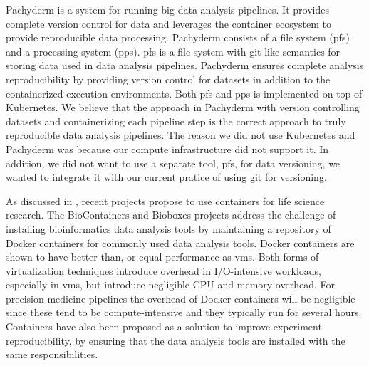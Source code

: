 Pachyderm is a system for running  big data analysis pipelines. It provides
complete version control for data and leverages the container ecosystem to
provide reproducible data processing.\cite{pachyderm} Pachyderm
consists of a file system (\gls{pfs}) and a processing system (\gls{pps}).
\gls{pfs} is a file system with git-like semantics for storing data used
in data analysis pipelines. Pachyderm ensures complete analysis reproducibility
by providing version control for datasets in addition to the containerized
execution environments. Both \gls{pfs} and \gls{pps} is implemented on top
of Kubernetes.\cite{kubernetes} We believe that the approach in
Pachyderm with version controlling datasets and containerizing each pipeline
step is the correct approach to truly reproducible data analysis pipelines. 
The reason we did not use Kubernetes and Pachyderm was because our compute
infrastructure did not support it. In addition, we did not want to use a separate
tool, \gls{pfs}, for data versioning, we wanted to integrate it with our current
pratice of using git for versioning. 

As discussed in \cite{NIK}, recent projects propose to use containers for life
science research. The BioContainers and Bioboxes\cite{belmann2015bioboxes}
projects address the challenge of installing bioinformatics data analysis tools
by maintaining a repository of Docker containers for commonly used data analysis
tools. Docker containers are shown to have better than, or equal performance as
\glspl{vm}.\cite{di2015impact} Both forms of virtualization techniques introduce
overhead in I/O-intensive workloads, especially in \glspl{vm}, but introduce
negligible CPU and memory overhead. For precision medicine pipelines the
overhead of Docker containers will be negligible since these tend to be
compute-intensive and they typically run for several hours.\cite{di2015impact}
Containers have also been proposed as a solution to improve experiment
reproducibility, by ensuring that the data analysis tools are installed with the
same responsibilities.\cite{boettiger2015introduction} 


